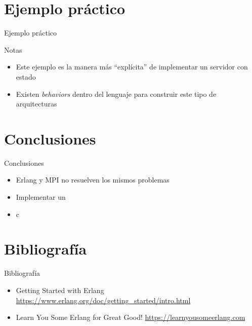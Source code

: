 \documentclass{beamer}
\begin{document}
  \section{Ejemplo práctico}
    \begin{frame}{Ejemplo práctico}
    \end{frame}

    \begin{frame}{Notas}
      \begin{itemize}
        \item Este ejemplo es la manera más ``explícita'' de implementar
        un servidor con estado
        \item Existen \textit{behaviors} dentro del lenguaje para construir
        este tipo de arquitecturas
      \end{itemize}
    \end{frame}

  \section{Conclusiones}
    \begin{frame}{Conclusiones}
      \begin{itemize}
        \item Erlang y MPI no resuelven los mismos problemas
        \item Implementar un
        \item c
      \end{itemize}
    \end{frame}

  \section{Bibliografía}
    \begin{frame}{Bibliografía}
      \begin{itemize}
        \item Getting Started with Erlang \url{https://www.erlang.org/doc/getting_started/intro.html}
        \item Learn You Some Erlang for Great Good! \url{https://learnyousomeerlang.com}
      \end{itemize}
    \end{frame}
\end{document}
